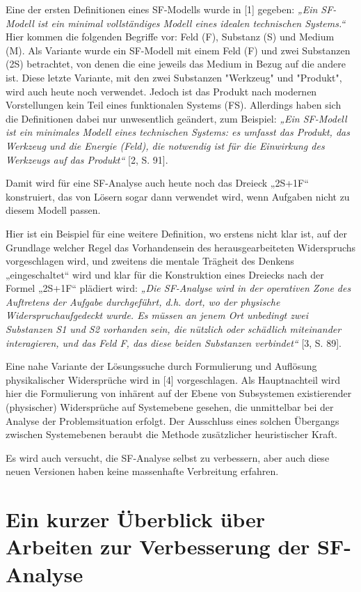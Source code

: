 \documentclass[11pt,a4paper]{article}
\begin{document}
Eine der ersten Definitionen eines SF-Modells wurde in [1] gegeben: \emph{„Ein
  SF-Modell ist ein minimal vollständiges Modell eines idealen technischen
  Systems.“} Hier kommen die folgenden Begriffe vor: Feld (F), Substanz (S)
und Medium (M). Als Variante wurde ein SF-Modell mit einem Feld (F) und zwei
Substanzen (2S) betrachtet, von denen die eine jeweils das Medium in Bezug auf
die andere ist. Diese letzte Variante, mit den zwei Substanzen "Werkzeug" und
"Produkt", wird auch heute noch verwendet. Jedoch ist das Produkt nach
modernen Vorstellungen kein Teil eines funktionalen Systems (FS). Allerdings
haben sich die Definitionen dabei nur unwesentlich geändert, zum Beispiel:
\emph{„Ein SF-Modell ist ein minimales Modell eines technischen Systems: es
  umfasst das Produkt, das Werkzeug und die Energie (Feld), die notwendig ist
  für die Einwirkung des Werkzeugs auf das Produkt“} [2, S. 91].

Damit wird für eine SF-Analyse auch heute noch das Dreieck „2S+1F“
konstruiert, das von Lösern sogar dann verwendet wird, wenn Aufgaben nicht zu
diesem Modell passen.

Hier ist ein Beispiel für eine weitere Definition, wo erstens nicht klar ist,
auf der Grundlage welcher Regel das Vorhandensein des herausgearbeiteten
Widerspruchs vorgeschlagen wird, und zweitens die mentale Trägheit des Denkens
„eingeschaltet“ wird und klar für die Konstruktion eines Dreiecks nach der
Formel „2S+1F“ plädiert wird: \emph{„Die SF-Analyse wird in der operativen
  Zone des Auftretens der Aufgabe durchgeführt, d.h. dort, wo der physische
  Widerspruchaufgedeckt wurde. Es müssen an jenem Ort unbedingt zwei
  Substanzen S1 und S2 vorhanden sein, die nützlich oder schädlich miteinander
  interagieren, und das Feld F, das diese beiden Substanzen verbindet“} [3,
  S. 89].

Eine nahe Variante der Lösungssuche durch Formulierung und Auflösung
physikalischer Widersprüche wird in [4] vorgeschlagen. Als Hauptnachteil wird
hier die Formulierung von inhärent auf der Ebene von Subsystemen existierender
(physischer) Widersprüche auf Systemebene gesehen, die unmittelbar bei der
Analyse der Problemsituation erfolgt.  Der Ausschluss eines solchen Übergangs
zwischen Systemebenen beraubt die Methode zusätzlicher heuristischer Kraft.

Es wird auch versucht, die SF-Analyse selbst zu verbessern, aber auch diese
neuen Versionen haben keine massenhafte Verbreitung erfahren.

\section*{Ein kurzer Überblick über Arbeiten zur Verbesserung der SF-Analyse} 
\end{document}
